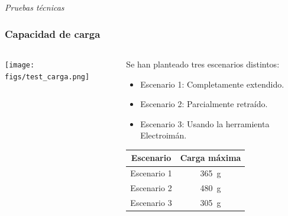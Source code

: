 \documentclass{beamer}
\begin{document}
\section*{}
\begin{frame}{}
  \centering \Huge
  \emph{Pruebas técnicas}
\end{frame}

\begin{frame}
  \frametitle{Capacidad de carga}
  \begin{columns}
    \begin{column}{0.35\textwidth} %
      \texttt{[image: figs/test\_carga.png]}
    \end{column}
    \begin{column}{0.5\textwidth} %
      Se han planteado tres escenarios distintos:
      \begin{itemize}
        \item Escenario 1: Completamente extendido.
        \item Escenario 2: Parcialmente retraído.
        \item Escenario 3: Usando la herramienta Electroimán.
      \end{itemize}
      \begin{table}[H]
        \begin{center}
        \begin{tabular}{|c|c|}
        \hline
        \textbf{Escenario} & \textbf{Carga máxima} \\
        \hline
        Escenario 1& \SI{365}{\gram} \\
        Escenario 2 & \SI{480}{\gram} \\
        Escenario 3 & \SI{305}{\gram} \\
        \hline
        \end{tabular}
        \end{center}
        \end{table}
    
      \end{column}
  \end{columns}
\end{frame}
\end{document}
